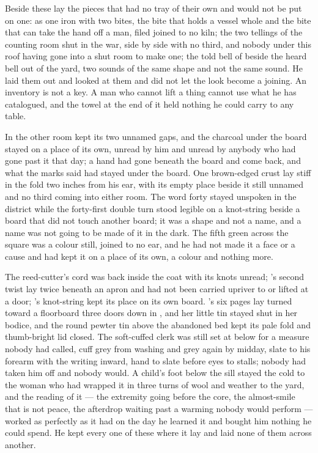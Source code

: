 Beside these lay the pieces that had no tray of their own and would not be put on one:  as one iron with two bites, the bite that holds a vessel whole and the bite that can take the hand off a man, filed joined to no kiln; the two tellings of the counting room shut in the war, side by side with no third, and nobody under this roof having gone into a shut room to make one; the told bell of  beside the heard bell out of the yard, two sounds of the same shape and not the same sound. He laid them out and looked at them and did not let the look become a joining. An inventory is not a key. A man who cannot lift a thing cannot use what he has catalogued, and the towel at the end of it held nothing he could carry to any table.

\scenebreak

In the other room  kept its two unnamed gaps, and the charcoal under the board stayed on a place of its own, unread by him and unread by anybody who had gone past it that day; a hand had gone beneath the board and come back, and what the marks said had stayed under the board. One brown-edged crust lay stiff in the fold two inches from his ear, with its empty place beside it still unnamed and no third coming into either room. The word forty stayed unspoken in the district while the forty-first double turn stood legible on a knot-string beside a board that did not touch another board; it was a shape and not a name, and a name was not going to be made of it in the dark. The fifth green across the square was a colour still, joined to no ear, and he had not made it a face or a cause and had kept it on a place of its own, a colour and nothing more.

The reed-cutter's cord was back inside the coat with its knots unread; 's second twist lay twice beneath an apron and had not been carried upriver to  or lifted at a door; 's knot-string kept its place on its own board. 's six pages lay turned toward a floorboard three doors down in , and her little tin stayed shut in her bodice, and the round pewter tin above the abandoned bed kept its pale fold and thumb-bright lid closed. The soft-cuffed clerk was still set at  below  for a measure nobody had called, cuff grey from washing and grey again by midday, slate to his forearm with the writing inward, hand to slate before eyes to stalls; nobody had taken him off and nobody would. A child's foot below the sill stayed the cold to the woman who had wrapped it in three turns of wool and weather to the yard, and the reading of it --- the extremity going before the core, the almost-smile that is not peace, the afterdrop waiting past a warming nobody would perform --- worked as perfectly as it had on the day he learned it and bought him nothing he could spend. He kept every one of these where it lay and laid none of them across another.

